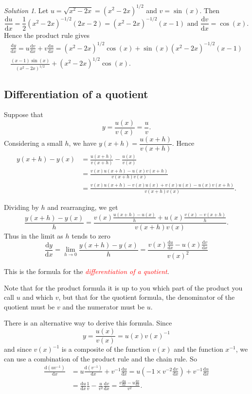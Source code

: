 \documentclass[
  11pt,
  oneside]{book}
\newcommand{\slide}{}
\theoremstyle{definition}
\theoremstyle{definition}
\theoremstyle{definition}
\theoremstyle{definition}
\theoremstyle{remark}
\newtheorem*{solution}{Solution}
\begin{document}
\begin{solution}
Let \(u = \sqrt{x^2-2x} = (x^2-2x)^{1/2}\) and \(v = \sin(x)\). Then
\[
\frac{\mathrm{d} u}{\mathrm{d} x} = \frac12(x^2-2x)^{-1/2}(2x-2)=(x^2-2x)^{-1/2}(x-1)\text{ and }\frac{\mathrm{d} v}{\mathrm{d} x} = \cos(x).
\]
Hence the product rule gives
\begin{gather*}
\frac{\mathrm{d} y}{\mathrm{d} x} = u\frac{\mathrm{d} v}{\mathrm{d} x} + v\frac{\mathrm{d} u}{\mathrm{d} x} = (x^2-2x)^{1/2}\cos(x) + \sin(x)(x^2-2x)^{-1/2}(x-1)\\
\frac{(x-1)\sin(x)}{(x^2-2x)^{1/2}} + (x^2-2x)^{1/2}\cos(x).
\end{gather*}
\end{solution}

\slide

\subsection{Differentiation of a quotient}\label{differentiation-of-a-quotient}

Suppose that
\[
y = \frac{u(x)}{v(x)} = \frac{u}{v}.
\]
Considering a small \(h\), we have \(y(x+h) = \dfrac{u(x+h)}{v(x+h)}\).
Hence
\begin{align*}
y(x+h)-y(x) &= \frac{u(x+h)}{v(x+h)} - \frac{u(x)}{v(x)}\\
&=\frac{v(x)u(x+h)-u(x)v(x+h)}{v(x+h)v(x)}\\
&=\tfrac{v(x)u(x+h)-v(x)u(x)+v(x)u(x)-u(x)v(x+h)}{v(x+h)v(x)}.
\end{align*}
\slide
Dividing by \(h\) and rearranging, we get
\[
\frac{y(x+h)-y(x)}{h} = \frac{v(x)\frac{u(x+h)-u(x)}{h}+u(x)\frac{v(x)-v(x+h)}{h}}{v(x+h)v(x)}.
\]
Thus in the limit as \(h\) tends to zero
\[\frac{\mathrm{d} y}{\mathrm{d} x} = \lim\limits_{h\to0}\frac{y(x+h)-y(x)}{h} = \frac{v(x)\frac{\mathrm{d} u}{\mathrm{d} x} - u(x)\frac{\mathrm{d} v}{\mathrm{d} x}}{v(x)^2}
\]

This is the formula for the \textcolor{red}{\em differentiation of a quotient}.

Note that for the product formula it is up to you which part of the product you call \(u\) and which \(v\), but that for the quotient formula, the denominator of the quotient must be \(v\) and the numerator must be \(u\).
\slide

There is an alternative way to derive this formula. Since
\[
y = \frac{u(x)}{v(x)} = u(x)v(x)^{-1}
\]
and since \(v(x)^{-1}\) is a composite of the function \(v(x)\) and the function \(x^{-1}\), we can use a combination of the product rule and the chain rule. So
\begin{align*}
\frac{\mathrm{d}(uv^{-1})}{\mathrm{d} x} &= u\frac{\mathrm{d}(v^{-1})}{\mathrm{d} x}+v^{-1}\frac{\mathrm{d} u}{\mathrm{d} x} = u\left(-1\times v^{-2}\frac{\mathrm{d} v}{\mathrm{d} x}\right) + v^{-1}\frac{\mathrm{d} u}{\mathrm{d} x}\\
&= \frac{\mathrm{d} u}{\mathrm{d} x}\frac{1}{v} - \frac{u}{v^2}\frac{\mathrm{d} v}{\mathrm{d} x} = \frac{v\frac{\mathrm{d} u}{\mathrm{d} x}-u\frac{\mathrm{d} v}{\mathrm{d} x}}{v^2}.
\end{align*}
\slide
\end{document}
